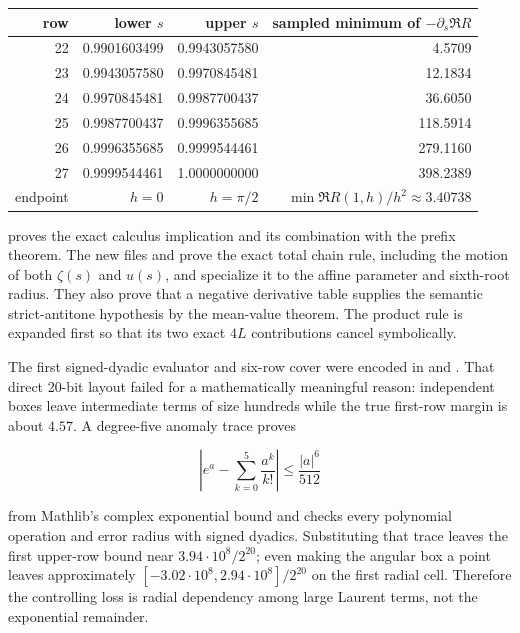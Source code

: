 \documentclass[11pt]{article}
\begin{document}
\begin{center}
\begin{tabular}{rrrr}
\toprule
row & lower $s$ & upper $s$ & sampled minimum of $-\partial_s\Re R$\\
\midrule
22 & 0.9901603499 & 0.9943057580 & 4.5709\\
23 & 0.9943057580 & 0.9970845481 & 12.1834\\
24 & 0.9970845481 & 0.9987700437 & 36.6050\\
25 & 0.9987700437 & 0.9996355685 & 118.5914\\
26 & 0.9996355685 & 0.9999544461 & 279.1160\\
27 & 0.9999544461 & 1.0000000000 & 398.2389\\
\midrule
endpoint & $h=0$ & $h=\pi/2$ &
  $\min \Re R(1,h)/h^2\approx3.40738$\\
\bottomrule
\end{tabular}
\end{center}

 proves the exact calculus implication and its
combination with the prefix theorem.  The new files
 and
 prove the exact total chain rule, including the
motion of both $\zeta(s)$ and $u(s)$, and specialize it to the affine parameter and sixth-root
radius.  They also prove that a negative derivative table supplies the semantic strict-antitone
hypothesis by the mean-value theorem.  The product rule is expanded first so that its two exact
$4L$ contributions cancel symbolically.

The first signed-dyadic evaluator and six-row cover were encoded in
 and
.  That direct 20-bit layout failed for a
mathematically meaningful reason: independent boxes leave intermediate terms of size hundreds
while the true first-row margin is about $4.57$.  A degree-five anomaly trace proves

\[
 \left|e^a-\sum_{k=0}^{5}\frac{a^k}{k!}\right|
 \leq \frac{|a|^6}{512}
\]

from Mathlib's complex exponential bound and checks every polynomial operation and error radius
with signed dyadics.  Substituting that trace leaves the first upper-row bound near
$3.94\cdot10^8/2^{20}$; even making the angular box a point leaves approximately
$[-3.02\cdot10^8,2.94\cdot10^8]/2^{20}$ on the first radial cell.  Therefore the controlling
loss is radial dependency among large Laurent terms, not the exponential remainder.
\end{document}
